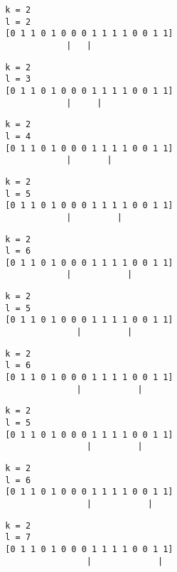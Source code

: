 { \begin{verbatim}
        k = 2
        l = 2
        [0 1 1 0 1 0 0 0 1 1 1 1 0 0 1 1]
                    |   |
\end{verbatim} }

{ \begin{verbatim}
        k = 2
        l = 3
        [0 1 1 0 1 0 0 0 1 1 1 1 0 0 1 1]
                    |     |
\end{verbatim} }

{ \begin{verbatim}
        k = 2
        l = 4
        [0 1 1 0 1 0 0 0 1 1 1 1 0 0 1 1]
                    |       |
\end{verbatim} }

{ \begin{verbatim}
        k = 2
        l = 5
        [0 1 1 0 1 0 0 0 1 1 1 1 0 0 1 1]
                    |         |
\end{verbatim} }

{ \begin{verbatim}
        k = 2
        l = 6
        [0 1 1 0 1 0 0 0 1 1 1 1 0 0 1 1]
                    |           |
\end{verbatim} }

{ \begin{verbatim}
        k = 2
        l = 5
        [0 1 1 0 1 0 0 0 1 1 1 1 0 0 1 1]
                      |         |
\end{verbatim} }

{ \begin{verbatim}
        k = 2
        l = 6
        [0 1 1 0 1 0 0 0 1 1 1 1 0 0 1 1]
                      |           |
\end{verbatim} }

{ \begin{verbatim}
        k = 2
        l = 5
        [0 1 1 0 1 0 0 0 1 1 1 1 0 0 1 1]
                        |         |
\end{verbatim} }

{ \begin{verbatim}
        k = 2
        l = 6
        [0 1 1 0 1 0 0 0 1 1 1 1 0 0 1 1]
                        |           |
\end{verbatim} }

{ \begin{verbatim}
        k = 2
        l = 7
        [0 1 1 0 1 0 0 0 1 1 1 1 0 0 1 1]
                        |             |
\end{verbatim} }

